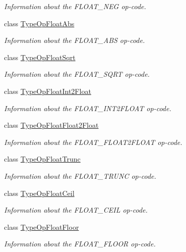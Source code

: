 \begin{DoxyCompactItemize}
\begin{DoxyCompactList}\small\item\em Information about the F\+L\+O\+A\+T\+\_\+\+N\+EG op-\/code. \end{DoxyCompactList}\item 
class \mbox{\hyperlink{class_type_op_float_abs}{Type\+Op\+Float\+Abs}}
\begin{DoxyCompactList}\small\item\em Information about the F\+L\+O\+A\+T\+\_\+\+A\+BS op-\/code. \end{DoxyCompactList}\item 
class \mbox{\hyperlink{class_type_op_float_sqrt}{Type\+Op\+Float\+Sqrt}}
\begin{DoxyCompactList}\small\item\em Information about the F\+L\+O\+A\+T\+\_\+\+S\+Q\+RT op-\/code. \end{DoxyCompactList}\item 
class \mbox{\hyperlink{class_type_op_float_int2_float}{Type\+Op\+Float\+Int2\+Float}}
\begin{DoxyCompactList}\small\item\em Information about the F\+L\+O\+A\+T\+\_\+\+I\+N\+T2\+F\+L\+O\+AT op-\/code. \end{DoxyCompactList}\item 
class \mbox{\hyperlink{class_type_op_float_float2_float}{Type\+Op\+Float\+Float2\+Float}}
\begin{DoxyCompactList}\small\item\em Information about the F\+L\+O\+A\+T\+\_\+\+F\+L\+O\+A\+T2\+F\+L\+O\+AT op-\/code. \end{DoxyCompactList}\item 
class \mbox{\hyperlink{class_type_op_float_trunc}{Type\+Op\+Float\+Trunc}}
\begin{DoxyCompactList}\small\item\em Information about the F\+L\+O\+A\+T\+\_\+\+T\+R\+U\+NC op-\/code. \end{DoxyCompactList}\item 
class \mbox{\hyperlink{class_type_op_float_ceil}{Type\+Op\+Float\+Ceil}}
\begin{DoxyCompactList}\small\item\em Information about the F\+L\+O\+A\+T\+\_\+\+C\+E\+IL op-\/code. \end{DoxyCompactList}\item 
class \mbox{\hyperlink{class_type_op_float_floor}{Type\+Op\+Float\+Floor}}
\begin{DoxyCompactList}\small\item\em Information about the F\+L\+O\+A\+T\+\_\+\+F\+L\+O\+OR op-\/code. \end{DoxyCompactList}\item 

\end{DoxyCompactItemize}
